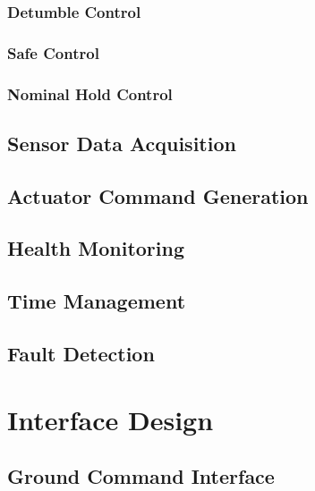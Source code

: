 \documentclass{article}
\begin{document}
            \subsubsection{Detumble Control}\label{sssec:detumble-control}

            \subsubsection{Safe Control}\label{sssec:safe-control}

            \subsubsection{Nominal Hold Control}\label{sssec:nominal-hold-control}

        \subsection{Sensor Data Acquisition}\label{ssec:sensor-acquisition}

        \subsection{Actuator Command Generation}\label{ssec:actuator-generation}

        \subsection{Health Monitoring}\label{ssec:health-monitoring}

        \subsection{Time Management}\label{ssec:time-management}

        \subsection{Fault Detection}\label{ssec:fault-detection}

    \section{Interface Design}\label{sec:interface-design}

        \subsection{Ground Command Interface}\label{ssec:ground-command-interface}
\end{document}
